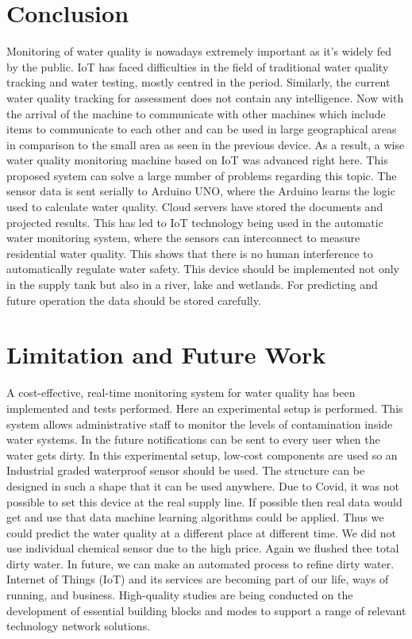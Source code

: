 \section{Conclusion}
Monitoring of water quality is nowadays extremely important as it's widely fed by the public. IoT has faced difficulties in the field of traditional water quality tracking and water testing, mostly centred in the period. Similarly, the current water quality tracking for assessment does not contain any intelligence. Now with the arrival of the machine to communicate with other machines which include items to communicate to each other and can be used in large geographical areas in comparison to the small area as seen in the previous device. As a result, a wise water quality monitoring machine based on IoT was advanced right here. This proposed system can solve a large number of problems regarding this topic. The sensor data is sent serially to Arduino UNO, where the Arduino learns the logic used to calculate water quality. Cloud servers have stored the documents and projected results. This has led to IoT technology being used in the automatic water monitoring system, where the sensors can interconnect to measure residential water quality. This shows that there is no human interference to automatically regulate water safety. This device should be implemented not only in the supply tank but also in a river, lake and wetlands. For predicting and future operation the data should be stored carefully.

\pagebreak
\section{Limitation and Future Work}
A cost-effective, real-time monitoring system for water quality has been implemented and tests performed. Here an experimental setup is performed. This system allows administrative staff to monitor the levels of contamination inside water systems. In the future notifications can be sent to every user when the water gets dirty. In this experimental setup, low-cost components are used so an Industrial graded waterproof sensor should be used. The structure can be designed in such a shape that it can be used anywhere. Due to Covid, it was not possible to set this device at the real supply line. If possible then real data would get and use that data machine learning algorithms could be applied. Thus we could predict the water quality at a different place at different time. We did not use individual chemical sensor due to the high price. Again we flushed thee total dirty water. In future, we can make an automated process to refine dirty water. Internet of Things (IoT) and its services are becoming part of our life, ways of running, and business. High-quality studies are being conducted on the development of essential building blocks and modes to support a range of relevant technology network solutions.

